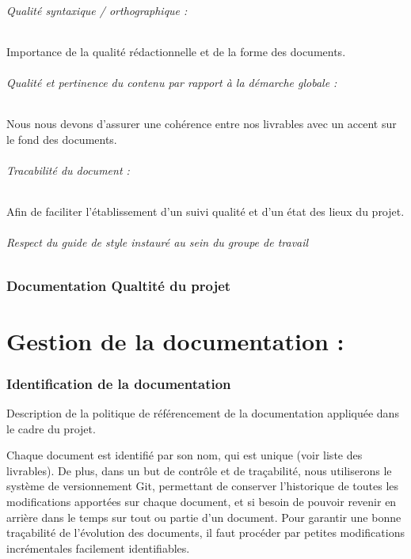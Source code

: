\documentclass[a4paper, 18pt]{article}
\begin{document}
\paragraph*{Qualité syntaxique / orthographique :} Importance de la qualité rédactionnelle et de la forme des documents.
\paragraph*{Qualité et pertinence du contenu par rapport à la démarche globale :} Nous nous devons d’assurer une cohérence entre nos livrables avec un accent sur le fond des documents.
\paragraph*{Tracabilité du document :} Afin de faciliter l’établissement d’un suivi qualité et d’un état des lieux du projet.
\paragraph*{Respect du guide de style instauré au sein du groupe de travail}

\section{Documentation Qualtité du projet}


\part{Gestion de la documentation :}

\section{Identification de la documentation}

Description de la politique de référencement de la documentation appliquée dans le cadre du projet.

Chaque document est identifié par son nom, qui est unique (voir liste des livrables). De plus, dans un but de contrôle
et de traçabilité, nous utiliserons le système de versionnement Git, permettant de conserver l'historique de toutes
les modifications apportées sur chaque document, et si besoin de pouvoir revenir en arrière dans le temps sur tout ou
partie d'un document. Pour garantir une bonne traçabilité de l'évolution des documents, il faut procéder par petites
modifications incrémentales facilement identifiables.
\end{document}
